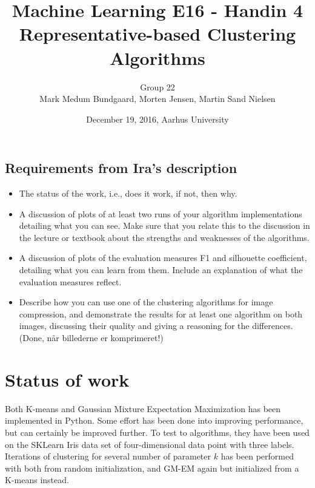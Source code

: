 \documentclass[a4paper,10pt,article,oneside,english]{memoir}
\begin{document}
	\title{Machine Learning E16 - Handin 4\\
		Representative-based Clustering Algorithms}
	\author{Group 22\\
		Mark Medum Bundgaard, Morten Jensen, Martin Sand Nielsen}
	\date{December 19, 2016, Aarhus University}
	
	\mainmatter
	\maketitle


\subsection{Requirements from Ira's description}
\begin{itemize}
	\item The status of the work, i.e., does it work, if not, then why.
	\item A discussion of plots of at least two runs of your algorithm implementations detailing what you can see. Make sure that you relate this to the discussion in the lecture or textbook about the strengths and weaknesses of the algorithms.
	\item A discussion of plots of the evaluation measures F1 and silhouette coefficient, detailing what you can learn from them. Include an explanation of what the evaluation measures reflect.
	\item Describe how you can use one of the clustering algorithms for image compression, and demonstrate the results for at least one algorithm on both images, discussing their quality and giving a reasoning for the differences. (Done, når billederne er komprimeret!)
\end{itemize}

\section*{Status of work}
Both K-means and Gaussian Mixture Expectation Maximization has been implemented in Python. Some effort has been done into improving performance, but can certainly be improved further. To test to algorithms, they have been used on the SKLearn Iris data set of four-dimensional data point with three labels. Iterations of clustering for several number of parameter $k$ has been performed with both from random initialization, and GM-EM again but initialized from a K-means instead. 
\end{document}
